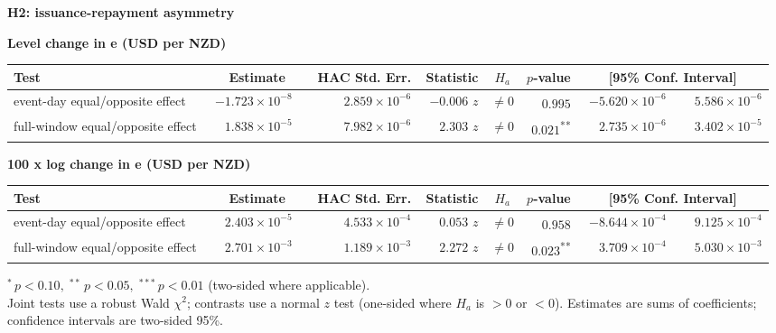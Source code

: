 \documentclass[10pt]{article}
\begin{document}
\begin{center}\large\textbf{H2: issuance-repayment asymmetry}\end{center}
\noindent\textbf{Level change in e (USD per NZD)}\\[0.3em]
\begin{tabular}{@{}>{\raggedright\arraybackslash}p{2.9in}|r@{}l rrcr rr@{}}
\hline
Test & \multicolumn{2}{c}{Estimate} & HAC Std. Err. & Statistic & $H_a$ & $p$-value & \multicolumn{2}{c}{[95\% Conf. Interval]} \\
\hline
event-day equal/opposite effect & $-1.723\!\times\!10^{-8}$ &  & $\phantom{-}2.859\!\times\!10^{-6}$ & $-0.006$ $z$ & $\neq 0$ & $0.995$\textsuperscript{} & $-5.620\!\times\!10^{-6}$ & $\phantom{-}5.586\!\times\!10^{-6}$ \\
full-window equal/opposite effect & $\phantom{-}1.838\!\times\!10^{-5}$ &  & $\phantom{-}7.982\!\times\!10^{-6}$ & $\phantom{-}2.303$ $z$ & $\neq 0$ & $0.021$\textsuperscript{**} & $\phantom{-}2.735\!\times\!10^{-6}$ & $\phantom{-}3.402\!\times\!10^{-5}$ \\
\hline
\end{tabular}
\vspace{1em}

\noindent\textbf{100 x log change in e (USD per NZD)}\\[0.3em]
\begin{tabular}{@{}>{\raggedright\arraybackslash}p{2.9in}|r@{}l rrcr rr@{}}
\hline
Test & \multicolumn{2}{c}{Estimate} & HAC Std. Err. & Statistic & $H_a$ & $p$-value & \multicolumn{2}{c}{[95\% Conf. Interval]} \\
\hline
event-day equal/opposite effect & $\phantom{-}2.403\!\times\!10^{-5}$ &  & $\phantom{-}4.533\!\times\!10^{-4}$ & $\phantom{-}0.053$ $z$ & $\neq 0$ & $0.958$\textsuperscript{} & $-8.644\!\times\!10^{-4}$ & $\phantom{-}9.125\!\times\!10^{-4}$ \\
full-window equal/opposite effect & $\phantom{-}2.701\!\times\!10^{-3}$ &  & $\phantom{-}1.189\!\times\!10^{-3}$ & $\phantom{-}2.272$ $z$ & $\neq 0$ & $0.023$\textsuperscript{**} & $\phantom{-}3.709\!\times\!10^{-4}$ & $\phantom{-}5.030\!\times\!10^{-3}$ \\
\hline
\end{tabular}
\vspace{1em}

{\footnotesize $^{*}\,p<0.10,\;^{**}\,p<0.05,\;^{***}\,p<0.01$ (two-sided where applicable).}
{\footnotesize\\ Joint tests use a robust Wald $\chi^2$; contrasts use a normal $z$ test (one-sided where $H_a$ is $>0$ or $<0$). Estimates are sums of coefficients; confidence intervals are two-sided 95\%.}
\end{document}
